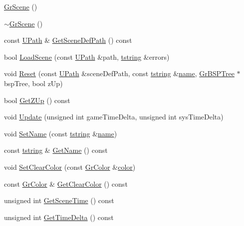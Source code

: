 \begin{CompactItemize}
\item 
\hyperlink{class_gr_scene_e34b9d499e43774f936ead2aaa262538}{GrScene} ()
\item 
\hyperlink{class_gr_scene_282d695d3b86b54e68319f2297a2e8b4}{$\sim$GrScene} ()
\item 
const \hyperlink{class_u_path}{UPath} \& \hyperlink{class_gr_scene_3553093b4916089dbba484029cba2d11}{GetSceneDefPath} () const 
\item 
bool \hyperlink{class_gr_scene_dba42ed71a18bab46a9c02aefb6c5b36}{LoadScene} (const \hyperlink{class_u_path}{UPath} \&path, \hyperlink{common__afx_8h_816fa58fd77499b0edb2c69ebe803d5c}{tstring} \&errors)
\item 
void \hyperlink{class_gr_scene_b95fdcbb9647160d1491e8de740122a7}{Reset} (const \hyperlink{class_u_path}{UPath} \&sceneDefPath, const \hyperlink{common__afx_8h_816fa58fd77499b0edb2c69ebe803d5c}{tstring} \&\hyperlink{glext__bak_8h_bb62efe59ccdd153ce42e1a418352209}{name}, \hyperlink{class_gr_b_s_p_tree}{GrBSPTree} $\ast$bspTree, bool zUp)
\item 
bool \hyperlink{class_gr_scene_d7926eb0813b3d6802b735a8c9a7880f}{GetZUp} () const 
\item 
void \hyperlink{class_gr_scene_c54d822c42d667aff5aea61a64553402}{Update} (unsigned int gameTimeDelta, unsigned int sysTimeDelta)
\item 
void \hyperlink{class_gr_scene_73ef4498b63c8574ad8c34c81b8c5baf}{SetName} (const \hyperlink{common__afx_8h_816fa58fd77499b0edb2c69ebe803d5c}{tstring} \&\hyperlink{glext__bak_8h_bb62efe59ccdd153ce42e1a418352209}{name})
\item 
const \hyperlink{common__afx_8h_816fa58fd77499b0edb2c69ebe803d5c}{tstring} \& \hyperlink{class_gr_scene_e7530eaa5692d6eecde9b90d14ff6639}{GetName} () const 
\item 
void \hyperlink{class_gr_scene_52d1ea4f232a02be349daed6a108a6c6}{SetClearColor} (const \hyperlink{class_gr_color}{GrColor} \&\hyperlink{glext_8h_3ea846f998d64f079b86052b6c4193a8}{color})
\item 
const \hyperlink{class_gr_color}{GrColor} \& \hyperlink{class_gr_scene_09f41cffdbef52b99439473e482faef8}{GetClearColor} () const 
\item 
unsigned int \hyperlink{class_gr_scene_38c11228869fe18212a2e9828d7664bb}{GetSceneTime} () const 
\item 
unsigned int \hyperlink{class_gr_scene_6b41fa1f794c9c955beff22da3f2e948}{GetTimeDelta} () const 
\item 

\end{CompactItemize}
